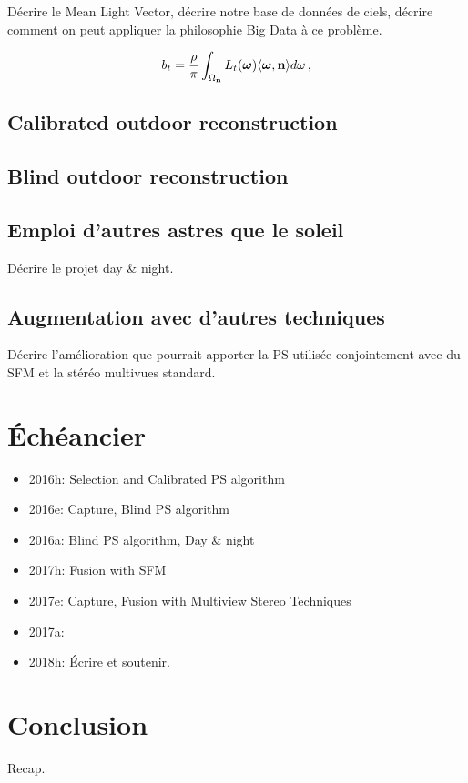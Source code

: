 \documentclass{report}
\begin{document}
Décrire le Mean Light Vector, décrire notre base de données de ciels, décrire comment on peut appliquer la philosophie Big Data à ce problème.

\begin{equation}
b_t = \frac{\rho}{\pi} \int_{\Omega_{\bf n}} L_t(\mathbf{\boldsymbol \omega}) \langle \boldsymbol \omega, {\bf n} \rangle d\omega \,,
\end{equation}

\section{Calibrated outdoor reconstruction}

\section{Blind outdoor reconstruction}

\section{Emploi d'autres astres que le soleil}

Décrire le projet day \& night.

\section{Augmentation avec d'autres techniques}

Décrire l'amélioration que pourrait apporter la PS utilisée conjointement avec du SFM et la stéréo multivues standard.


\chapter{Échéancier}

\begin{itemize}
	\item 2016h: Selection and Calibrated PS algorithm
	\item 2016e: Capture, Blind PS algorithm  
	\item 2016a: Blind PS algorithm, Day \& night
	\item 2017h: Fusion with SFM
	\item 2017e: Capture, Fusion with Multiview Stereo Techniques
	\item 2017a: 
	\item 2018h: Écrire et soutenir.
\end{itemize}


\chapter{Conclusion}\label{conclusion}

Recap.

{\small
%

}
\end{document}
